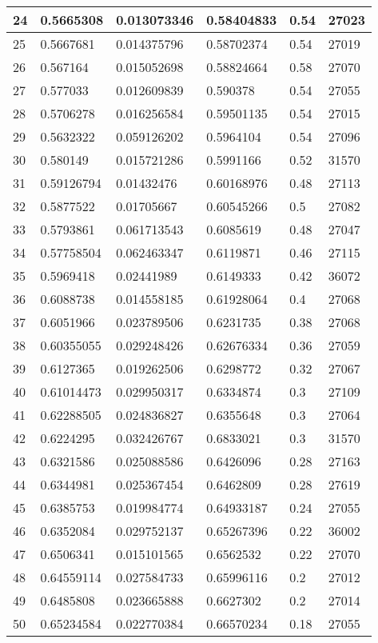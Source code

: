 \begin{longtable}{|l|l|l|l|l|l|}
24 & 0.5665308 & 0.013073346 & 0.58404833 & 0.54 & 27023 \\ \hline 
25 & 0.5667681 & 0.014375796 & 0.58702374 & 0.54 & 27019 \\ \hline 
26 & 0.567164 & 0.015052698 & 0.58824664 & 0.58 & 27070 \\ \hline 
27 & 0.577033 & 0.012609839 & 0.590378 & 0.54 & 27055 \\ \hline 
28 & 0.5706278 & 0.016256584 & 0.59501135 & 0.54 & 27015 \\ \hline 
29 & 0.5632322 & 0.059126202 & 0.5964104 & 0.54 & 27096 \\ \hline 
30 & 0.580149 & 0.015721286 & 0.5991166 & 0.52 & 31570 \\ \hline 
31 & 0.59126794 & 0.01432476 & 0.60168976 & 0.48 & 27113 \\ \hline 
32 & 0.5877522 & 0.01705667 & 0.60545266 & 0.5 & 27082 \\ \hline 
33 & 0.5793861 & 0.061713543 & 0.6085619 & 0.48 & 27047 \\ \hline 
34 & 0.57758504 & 0.062463347 & 0.6119871 & 0.46 & 27115 \\ \hline 
35 & 0.5969418 & 0.02441989 & 0.6149333 & 0.42 & 36072 \\ \hline 
36 & 0.6088738 & 0.014558185 & 0.61928064 & 0.4 & 27068 \\ \hline 
37 & 0.6051966 & 0.023789506 & 0.6231735 & 0.38 & 27068 \\ \hline 
38 & 0.60355055 & 0.029248426 & 0.62676334 & 0.36 & 27059 \\ \hline 
39 & 0.6127365 & 0.019262506 & 0.6298772 & 0.32 & 27067 \\ \hline 
40 & 0.61014473 & 0.029950317 & 0.6334874 & 0.3 & 27109 \\ \hline 
41 & 0.62288505 & 0.024836827 & 0.6355648 & 0.3 & 27064 \\ \hline 
42 & 0.6224295 & 0.032426767 & 0.6833021 & 0.3 & 31570 \\ \hline 
43 & 0.6321586 & 0.025088586 & 0.6426096 & 0.28 & 27163 \\ \hline 
44 & 0.6344981 & 0.025367454 & 0.6462809 & 0.28 & 27619 \\ \hline 
45 & 0.6385753 & 0.019984774 & 0.64933187 & 0.24 & 27055 \\ \hline 
46 & 0.6352084 & 0.029752137 & 0.65267396 & 0.22 & 36002 \\ \hline 
47 & 0.6506341 & 0.015101565 & 0.6562532 & 0.22 & 27070 \\ \hline 
48 & 0.64559114 & 0.027584733 & 0.65996116 & 0.2 & 27012 \\ \hline 
49 & 0.6485808 & 0.023665888 & 0.6627302 & 0.2 & 27014 \\ \hline 
50 & 0.65234584 & 0.022770384 & 0.66570234 & 0.18 & 27055 \\ \hline 
\end{longtable}